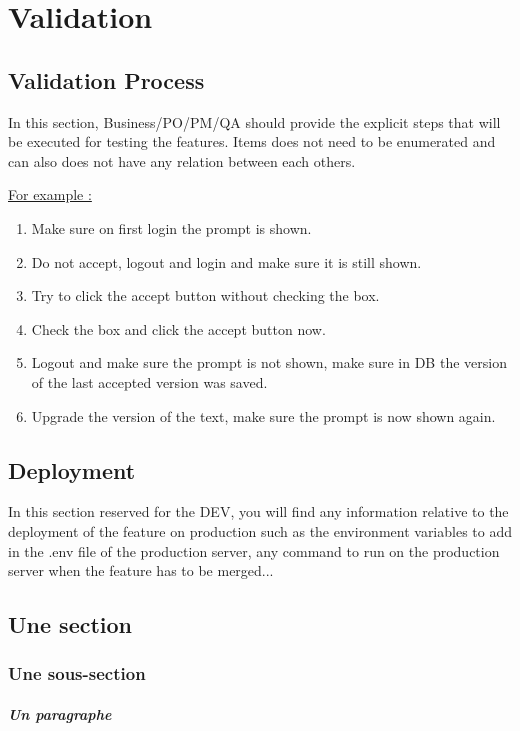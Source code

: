 \documentclass{book}
\begin{document}
      \chapter{Validation}
        \section{Validation Process}
        In this section, \gls{Business}/\gls{PO}/\gls{PM}/\gls{QA} should provide the explicit steps that will be executed for testing the features. Items does not need to be enumerated and can also does not have any relation between each others.
        
        \underline{For example :}
                \begin{enumerate}
  			\item Make sure on first login the prompt is shown.
  			\item Do not accept, logout and login and make sure it is still shown.
  			\item Try to click the accept button without checking the box.
  			 \item Check the box and click the accept button now.
  			 \item Logout and make sure the prompt is not shown, make sure in DB the version of the last accepted version was saved.
  			 \item Upgrade the version of the text, make sure the prompt is now shown again.
		\end{enumerate}
        \section{Deployment}
        In this section reserved for the \gls{DEV}, you will find any information relative to the deployment of the feature on production such as the environment variables to add in the .env file of the production server, any command to run on the production server when the feature has to be merged... 
        \section{Une section}
            \subsection{Une sous-section}
                \paragraph{Un paragraphe}
\end{document}
